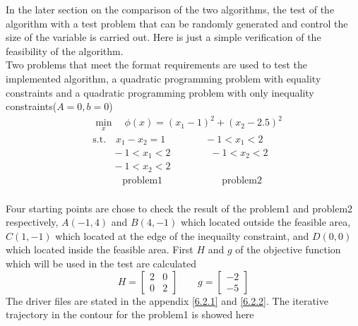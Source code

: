 In the later section on the comparison of the two algorithms, the test of the algorithm with a test problem that can be randomly generated and control the size of the variable is carried out. Here is just a simple verification of the feasibility of the algorithm.\\
Two problems that meet the format requirements are used to test the implemented algorithm, a quadratic programming problem with equality constraints and a quadratic programming problem with only inequality constraints($A=0, b=0$)\\
\begin{align*}
    &\min_{x}\quad \phi(x)=\left(x_1-1\right)^2+\left(x_2-2.5\right)^2 \tag{2.22}\\
    &\text{s.t.} \quad x_1-x_2= 1   \qquad \qquad -1<x_1<2\\
    &\quad \quad -1<x_1<2 \qquad \qquad -1<x_2<2\\
    &\quad \quad -1<x_2<2\\
    &\quad \qquad \text{problem1} \qquad \qquad \qquad \text{problem2}
\end{align*}\\
Four starting points are chose to check the result of the problem1 and problem2 respectively, $A(-1,4)$ and $B(4,-1)$ which located outside the feasible area, $C(1,-1)$ which located at the edge of the inequailty constraint, and $D(0,0)$ which located inside the feasible area. First $H$ and $g$ of the objective function which will be used in the test are calculated
$$H=\begin{bmatrix}
2&0\\
0&2
\end{bmatrix} \qquad 
g=\begin{bmatrix}
-2\\
-5
\end{bmatrix}$$
The driver files are stated in the appendix \ref{6.2.1} and \ref{6.2.2}. The iterative trajectory in the contour for the problem1 is showed here
\vspace{-0.3cm}
